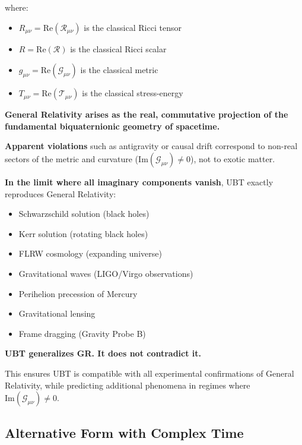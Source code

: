 \documentclass[12pt,a4paper]{article}
\begin{document}
where:
\begin{itemize}
    \item $R_{\mu\nu} = \text{Re}(\mathcal{R}_{\mu\nu})$ is the classical Ricci tensor
    \item $R = \text{Re}(\mathcal{R})$ is the classical Ricci scalar
    \item $g_{\mu\nu} = \text{Re}(\mathcal{G}_{\mu\nu})$ is the classical metric
    \item $T_{\mu\nu} = \text{Re}(\mathcal{T}_{\mu\nu})$ is the classical stress-energy
\end{itemize}

\begin{tcolorbox}[colback=blue!5!white,colframe=blue!75!black,title=Key Statement: GR as Real Projection]
\textbf{General Relativity arises as the real, commutative projection of the fundamental biquaternionic geometry of spacetime.}

\textbf{Apparent violations} such as antigravity or causal drift correspond to non-real sectors of the metric and curvature ($\text{Im}(\mathcal{G}_{\mu\nu}) \neq 0$), not to exotic matter.

\textbf{In the limit where all imaginary components vanish}, UBT exactly reproduces General Relativity:
\begin{itemize}
    \item Schwarzschild solution (black holes)
    \item Kerr solution (rotating black holes)
    \item FLRW cosmology (expanding universe)
    \item Gravitational waves (LIGO/Virgo observations)
    \item Perihelion precession of Mercury
    \item Gravitational lensing
    \item Frame dragging (Gravity Probe B)
\end{itemize}

\textbf{UBT generalizes GR. It does not contradict it.}

This ensures UBT is compatible with all experimental confirmations of General Relativity, while predicting additional phenomena in regimes where $\text{Im}(\mathcal{G}_{\mu\nu}) \neq 0$.
\end{tcolorbox}

\subsection{Alternative Form with Complex Time}
\end{document}
